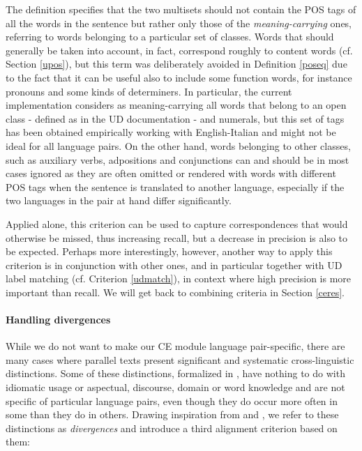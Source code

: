 The definition specifies that the two multisets should not contain the POS tags of all the words in the sentence but rather only those of the \textit{meaning-carrying} ones, referring to words belonging to a particular set of classes. 
Words that should generally be taken into account, in fact, correspond roughly to content words (cf. Section \ref{upos}), but this term was deliberately avoided in Definition \ref{poseq} due to the fact that it can be useful also to include some function words, for instance pronouns and some kinds of determiners.
In particular, the current implementation considers as meaning-carrying all words that belong to an open class - defined as in the UD documentation \cite{openpos} - and numerals, but this set of tags has been obtained empirically working with English-Italian and might not be ideal for all language pairs.
On the other hand, words belonging to other classes, such as auxiliary verbs, adpositions and conjunctions can and should be in most cases ignored as they are often omitted or rendered with words with different POS tags when the sentence is translated to another language, especially if the two languages in the pair at hand differ significantly. \smallskip

Applied alone, this criterion can be used to capture correspondences that would otherwise be missed, thus increasing recall, but a decrease in precision is also to be expected. Perhaps more interestingly, however, another way to apply this criterion is in conjunction with other ones, and in particular together with UD label matching (cf. Criterion \ref{udmatch}), in context where high precision is more important than recall. We will get back to combining criteria in Section \ref{ceres}.

\paragraph{Handling divergences} \label{divs}
While we do not want to make our CE module language pair-specific, there are many cases where parallel texts present significant and systematic cross-linguistic distinctions. Some of these distinctions, formalized in \cite{divs}, have nothing to do with idiomatic usage or aspectual, discourse, domain or word knowledge and are not specific of particular language pairs, even though they do occur more often in some than they do in others. 
Drawing inspiration from \cite{divs} and \cite{divs2}, we refer to these distinctions as \textit{divergences} and introduce a third alignment criterion based on them: \smallskip

